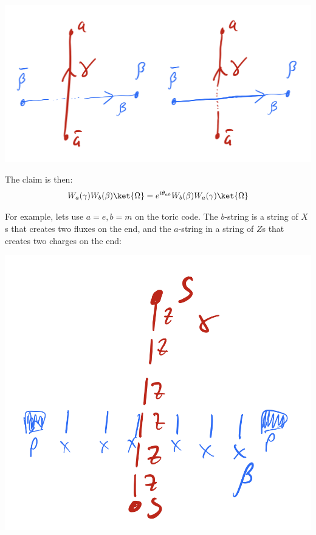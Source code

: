 \begin{center}
    \includegraphics[scale=0.35]{Lectures/Images/lec6-stringoporder.png}
\end{center}

The claim is then:
\begin{equation}\label{eq:stringopmutualstat}
    W_a(\gamma)W_b(\beta)\ket{\Omega} = e^{i\theta_{ab}} W_b(\beta)W_a(\gamma)\ket{\Omega}
\end{equation}

For example, lets use $a = e, b = m$ on the toric code. The $b$-string is a string of $X$s that creates two fluxes on the end, and the $a$-string in a string of $Z$s that creates two charges on the end:

\begin{center}
    \includegraphics[scale=0.35]{Lectures/Images/lec6-stringopanticommute.png}
\end{center}

